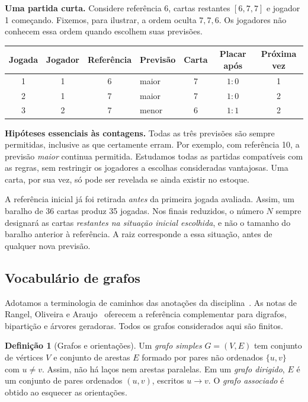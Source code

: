 \documentclass[11pt,a4paper]{article}
\theoremstyle{definition}
\newtheorem{definicao}{Definição}[section]
\newcommand{\destaque}[1]{\par\smallskip\noindent\textbf{#1}\enspace}
\newcommand{\proxpagina}{\newpage}
\begin{document}
\destaque{Uma partida curta.}
Considere referência 6, cartas restantes $[6,7,7]$ e jogador 1 começando. Fixemos, para ilustrar, a ordem oculta $7,7,6$. Os jogadores não conhecem essa ordem quando escolhem suas previsões.
\begin{center}
\small
\begin{tabular}{@{}ccclccc@{}}
\toprule
Jogada & Jogador & Referência & Previsão & Carta & Placar após & Próxima vez\\
\midrule
1 & 1 & 6 & maior & 7 & $1\!:\!0$ & 1\\
2 & 1 & 7 & maior & 7 & $1\!:\!0$ & 2\\
3 & 2 & 7 & menor & 6 & $1\!:\!1$ & 2\\
\bottomrule
\end{tabular}
\end{center}

\destaque{Hipóteses essenciais às contagens.}
Todas as três previsões são sempre permitidas, inclusive as que certamente erram. Por exemplo, com referência 10, a previsão \emph{maior} continua permitida. Estudamos todas as partidas compatíveis com as regras, sem restringir os jogadores a escolhas consideradas vantajosas. Uma carta, por sua vez, só pode ser revelada se ainda existir no estoque.

A referência inicial já foi retirada \emph{antes} da primeira jogada avaliada. Assim, um baralho de 36 cartas produz 35 jogadas. Nos finais reduzidos, o número $N$ sempre designará as cartas \emph{restantes na situação inicial escolhida}, e não o tamanho do baralho anterior à referência. A raiz corresponde a essa situação, antes de qualquer nova previsão.

\proxpagina
\subsection{Vocabulário de grafos}
Adotamos a terminologia de caminhos das anotações da disciplina~\cite{nina}. As notas de Rangel, Oliveira e Araujo~\cite{rangel} oferecem a referência complementar para digrafos, bipartição e árvores geradoras. Todos os grafos considerados aqui são finitos.

\begin{definicao}[Grafos e orientações]
Um \emph{grafo simples} $G=(V,E)$ tem conjunto de vértices $V$ e conjunto de arestas $E$ formado por pares não ordenados $\{u,v\}$ com $u\ne v$. Assim, não há laços nem arestas paralelas. Em um \emph{grafo dirigido}, $E$ é um conjunto de pares ordenados $(u,v)$, escritos $u\to v$. O \emph{grafo associado} é obtido ao esquecer as orientações.
\end{definicao}
\end{document}
